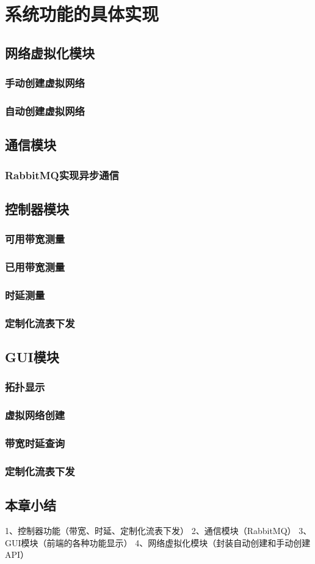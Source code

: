 \chapter{系统功能的具体实现}
\section{网络虚拟化模块}
\subsection{手动创建虚拟网络}
\subsection{自动创建虚拟网络}
\section{通信模块}
\subsection{RabbitMQ实现异步通信}
\section{控制器模块}
\subsection{可用带宽测量}
\subsection{已用带宽测量}
\subsection{时延测量}
\subsection{定制化流表下发}
\section{GUI模块}
\subsection{拓扑显示}
\subsection{虚拟网络创建}
\subsection{带宽时延查询}
\subsection{定制化流表下发}
\section{本章小结}



1、控制器功能（带宽、时延、定制化流表下发）
2、通信模块（RabbitMQ）
3、GUI模块（前端的各种功能显示）
4、网络虚拟化模块（封装自动创建和手动创建API）


\ifx\usechapbib\empty
\nocite{BSTcontrol}
\setcounter{NAT@ctr}{0}


\fi